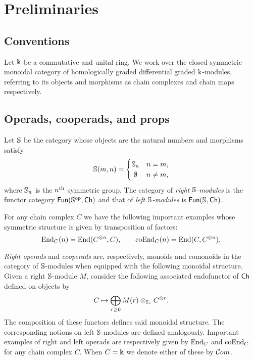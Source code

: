 
\section{Preliminaries} \label{s:preliminaries}

\subsection{Conventions}

Let $\Bbbk$ be a commutative and unital ring.
We work over the closed symmetric monoidal category of homologically graded differential graded $\Bbbk$-modules, referring to its objects and morphisms as chain complexes and chain maps respectively.

\subsection{Operads, cooperads, and props}

Let $\mathbb{S}$ be the category whose objects are the natural numbers and morphisms satisfy
\[
\Sym(m,n) = \begin{cases}
\Sym_n & n = m, \\
\hfil \emptyset & n \neq m,
\end{cases}
\]
where $\mathbb{S}_n$ is the $n^{\mathrm{th}}$ symmetric group.
The category of \textit{right $\mathbb{S}$-modules} is the functor category $\mathsf{Fun}(\mathbb{S}^{\mathrm{op}}, \mathsf{Ch})$ and that of \textit{left $\mathbb{S}$-modules} is $\mathsf{Fun}(\mathbb{S}, \mathsf{Ch})$.

For any chain complex $C$ we have the following important examples whose symmetric structure is given by transposition of factors:
\begin{equation} \label{e:endo and coendo operads}
\mathrm{End}_C(n) = \mathrm{End}(C^{\otimes n}, C), \qquad
\mathrm{coEnd}_C(n) = \mathrm{End}(C, C^{\otimes n}).
\end{equation}

\textit{Right operads} and \textit{cooperads} are, respectively, monoids and comonoids in the category of $\mathbb{S}$-modules when equipped with the following monoidal structure.
Given a right $\mathbb{S}$-module $M$, consider the following associated endofunctor of $\mathsf{Ch}$ defined on objects by
\[
C \mapsto \bigoplus_{r \geq 0} M(r) \otimes_{\mathbb{S}_r} C^{\otimes r}.
\]
The composition of these functors defines said monoidal structure.
The corresponding notions on left $\mathbb{S}$-modules are defined analogously.
Important examples of right and left operads are respectively given by $\mathrm{End}_C$ and $\mathrm{coEnd}_C$ for any chain complex $C$.
When $C = \Bbbk$ we denote either of these by $\mathcal{C}om$.


